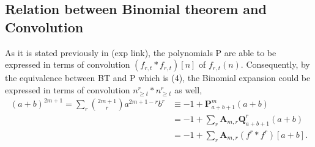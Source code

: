 \documentclass[12pt, letterpaper]{amsart}
\theoremstyle{definition}
\theoremstyle{remark}
\numberwithin{equation}{section}
\begin{document}
\subsection{Relation between Binomial theorem and Convolution}
As it is stated previously in (exp link), the polynomials P are able to be expressed in terms of convolution $(f_{r,t} \ast f_{r,t})[n]$ of $f_{r,t}(n)$. Consequently, by the equivalence between BT and P which is (4), the Binomial expansion could be expressed in terms of convolution $n_{\geq t}^r \ast n_{\geq t}^r$ as well,
\begin{equation*}
\begin{split}
(a+b)^{2m+1}=\sum_{r} \binom{2m+1}{r} a^{2m+1-r} b^r
&\equiv -1+\mathbf{P}^{m}_{a+b+1}(a+b) \\
&= -1+\sum_{r}\mathbf{A}_{m,r}\mathbf{Q}^{r}_{a+b+1}(a+b)\\
&= -1+\sum\limits_{r}\mathbf{A}_{m,r} (f^{r} \ast f^{r})[a+b].
\end{split}
\end{equation*}
\end{document}
